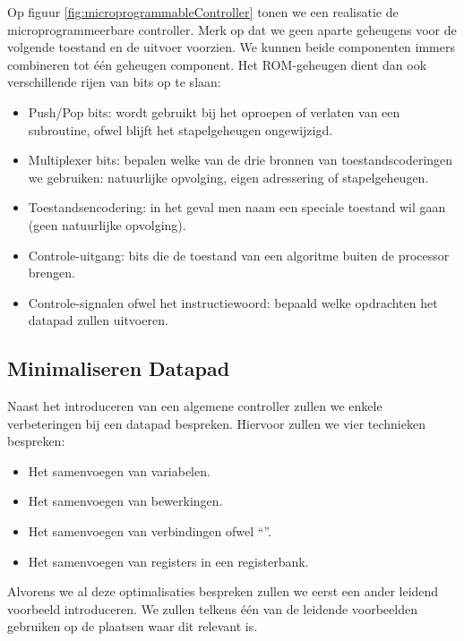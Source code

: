 Op figuur \ref{fig:microprogrammableController} tonen we een realisatie de microprogrammeerbare controller. Merk op dat we geen aparte geheugens voor de volgende toestand en de uitvoer voorzien. We kunnen beide componenten immers combineren tot \'e\'en geheugen component. Het ROM-geheugen dient dan ook verschillende rijen van bits op te slaan:
\begin{itemize}
 \item Push/Pop bits: wordt gebruikt bij het oproepen of verlaten van een subroutine, ofwel blijft het stapelgeheugen ongewijzigd.
 \item Multiplexer bits: bepalen welke van de drie bronnen van toestandscoderingen we gebruiken: natuurlijke opvolging, eigen adressering of stapelgeheugen.
 \item Toestandsencodering: in het geval men naam een speciale toestand wil gaan (geen natuurlijke opvolging).
 \item Controle-uitgang: bits die de toestand van een algoritme buiten de processor brengen.
 \item Controle-signalen ofwel het instructiewoord: bepaald welke opdrachten het datapad zullen uitvoeren.
\end{itemize}
\subsection{Minimaliseren Datapad}
\label{ss:syntheseFSMDDatapad}
Naast het introduceren van een algemene controller zullen we enkele verbeteringen bij een datapad bespreken. Hiervoor zullen we vier technieken bespreken:
\begin{itemize}
 \item Het samenvoegen van variabelen.
 \item Het samenvoegen van bewerkingen.
 \item Het samenvoegen van verbindingen ofwel ``''.
 \item Het samenvoegen van registers in een registerbank.
\end{itemize}
Alvorens we al deze optimalisaties bespreken zullen we eerst een ander leidend voorbeeld introduceren. We zullen telkens \'e\'en van de leidende voorbeelden gebruiken op de plaatsen waar dit relevant is.
